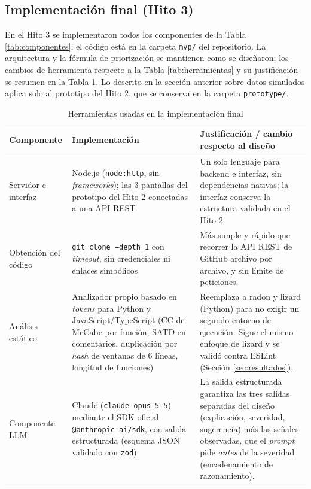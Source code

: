 \subsection{Implementación final (Hito 3)}
\label{sec:implementacion}

En el Hito 3 se implementaron todos los componentes de la Tabla \ref{tab:componentes}; el código está en la carpeta \texttt{mvp/} del repositorio. La arquitectura y la fórmula de priorización se mantienen como se diseñaron; los cambios de herramienta respecto a la Tabla \ref{tab:herramientas} y su justificación se resumen en la Tabla \ref{tab:implementacion}. Lo descrito en la sección anterior sobre datos simulados aplica solo al prototipo del Hito 2, que se conserva en la carpeta \texttt{prototype/}.

\begin{table}[H]
\centering
\caption{Herramientas usadas en la implementación final}
\label{tab:implementacion}
\begin{tabular}{p{} p{} p{}}
\toprule
\textbf{Componente} & \textbf{Implementación} & \textbf{Justificación / cambio respecto al diseño} \\
\midrule
Servidor e interfaz & Node.js (\texttt{node:http}, sin \textit{frameworks}); las 3 pantallas del prototipo del Hito 2 conectadas a una API REST & Un solo lenguaje para backend e interfaz, sin dependencias nativas; la interfaz conserva la estructura validada en el Hito 2. \\[4pt]
Obtención del código & \texttt{git clone --depth 1} con \textit{timeout}, sin credenciales ni enlaces simbólicos & Más simple y rápido que recorrer la API REST de GitHub archivo por archivo, y sin límite de peticiones. \\[4pt]
Análisis estático & Analizador propio basado en \textit{tokens} para Python y JavaScript/TypeScript (CC de McCabe por función, SATD en comentarios, duplicación por \textit{hash} de ventanas de 6 líneas, longitud de funciones) & Reemplaza a radon y lizard (Python) para no exigir un segundo entorno de ejecución. Sigue el mismo enfoque de lizard \parencite{LizardDocs} y se validó contra ESLint (Sección \ref{sec:resultados}). \\[4pt]
Componente LLM & Claude (\texttt{claude-opus-5-5}) \parencite{AnthropicClaude} mediante el SDK oficial \texttt{@anthropic-ai/sdk}, con salida estructurada (esquema JSON validado con \texttt{zod}) & La salida estructurada garantiza las tres salidas separadas del diseño (explicación, severidad, sugerencia) más las señales observadas, que el \textit{prompt} pide \emph{antes} de la severidad (encadenamiento de razonamiento). \\[4pt]

\end{tabular}
\end{table}
